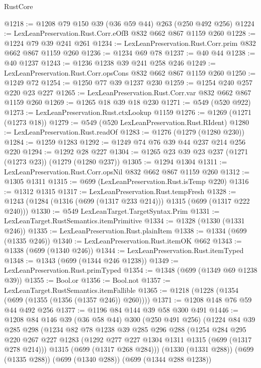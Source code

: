 \begin{lexlean}{RustCore}
\begin{coremodule}
@1218 := @1208 @79 @150 @39 (@36 @59 @44) @263 (@250 @492 @256)
@1224 := LexLeanPreservation.Rust.Corr.eOfB @832 @662 @867 @1159 @260
@1228 := @1224 @79 @39 @241 @261
@1234 := LexLeanPreservation.Rust.Corr.prim @832 @662 @867 @1159 @260
@1236 := @1234 @69 @78
@1237 := @40 @44
@1238 := @40 @1237
@1243 := @1236 @1238 @39 @241 @258 @246
@1249 := LexLeanPreservation.Rust.Corr.opsCons @832 @662 @867 @1159 @260
@1250 := @1249 @72
@1254 := @1250 @77 @39 @1237 @230
@1259 := @1254 @240 @257 @220 @23 @227
@1265 := LexLeanPreservation.Rust.Corr.var @832 @662 @867 @1159 @260
@1269 := @1265 @18 @39 @18 @230
@1271 := @549 (@520 @922)
@1273 := LexLeanPreservation.Rust.ctxLookup @1159
@1276 := @1269 (@1271 (@1273 @18))
@1279 := @549 (@520 LexLeanPreservation.Rust.RIdent)
@1280 := LexLeanPreservation.Rust.readOf
@1283 := @1276 (@1279 (@1280 @230))
@1284 := @1259 @1283
@1292 := @1249 @74 @76 @39 @44 @237 @214 @256 @220
@1294 := @1292 @28 @227
@1304 := @1265 @23 @39 @23 @237 (@1271 (@1273 @23)) (@1279 (@1280 @237))
@1305 := @1294 @1304
@1311 := LexLeanPreservation.Rust.Corr.opsNil @832 @662 @867 @1159 @260
@1312 := @1305 @1311
@1315 := @699 (LexLeanPreservation.Rust.isTemp @220)
@1316 := @1312 @1315
@1317 := LexLeanPreservation.Rust.tempFresh
@1328 := @1243 (@1284 (@1316 (@699 (@1317 @233 @214))) @1315 (@699 (@1317 @222 @240)))
@1330 := @549 LexLeanTarget.TargetSyntax.Prim
@1331 := LexLeanTarget.RustSemantics.itemPrimitive
@1334 := @1328 (@1330 (@1331 @246))
@1335 := LexLeanPreservation.Rust.plainItem
@1338 := @1334 (@699 (@1335 @246))
@1340 := LexLeanPreservation.Rust.itemOK @662
@1343 := @1338 (@699 (@1340 @246))
@1344 := LexLeanPreservation.Rust.itemTyped
@1348 := @1343 (@699 (@1344 @246 @1238))
@1349 := LexLeanPreservation.Rust.primTyped
@1354 := @1348 (@699 (@1349 @69 @1238 @39))
@1355 := Bool.or
@1356 := Bool.not
@1357 := LexLeanTarget.RustSemantics.itemFallible
@1365 := @1218 (@1228 (@1354 (@699 (@1355 (@1356 (@1357 @246)) @260))))
@1371 := @1208 @148 @76 @59 @44 @492 @256
@1377 := @1196 @84 @144 @39 @58 @300 @491
@1446 := @1208
    @84
    @146
    @39
    (@36 @58 @44)
    @300
    (@250 @491 @256)
    (@1224
      @84
      @39
      @285
      @298
      (@1234
        @82
        @78
        @1238
        @39
        @285
        @296
        @288
        (@1254
          @284
          @295
          @220
          @267
          @227
          @1283
          (@1292 @277 @227 @1304 @1311 @1315 (@699 (@1317 @278 @214)))
          @1315
          (@699 (@1317 @268 @284)))
        (@1330 (@1331 @288))
        (@699 (@1335 @288))
        (@699 (@1340 @288))
        (@699 (@1344 @288 @1238))

\end{coremodule}
\end{lexlean}
